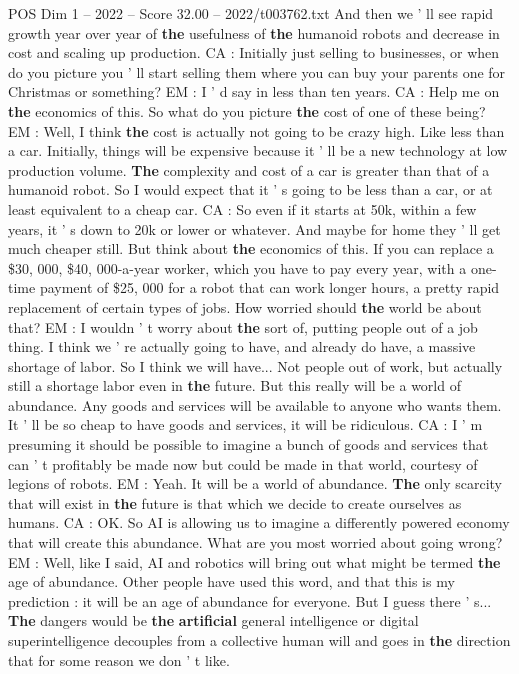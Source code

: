 \begin{textsample}{POS Dim 1 – 2022 – Score 32.00 – 2022/t003762.txt}
And then we ' ll see rapid growth year over year of \textbf{the} usefulness of \textbf{the} humanoid robots and decrease in cost and scaling up production.
CA : Initially just selling to businesses, or when do you picture you ' ll start selling them where you can buy your parents one for Christmas or something?
EM : I ' d say in less than ten years.
CA : Help me on \textbf{the} economics of this.
So what do you picture \textbf{the} cost of one of these being?
EM : Well, I think \textbf{the} cost is actually not going to be crazy high.
Like less than a car.
Initially, things will be expensive because it ' ll be a new technology at low production volume. \textbf{The} complexity and cost of a car is greater than that of a humanoid robot.
So I would expect that it ' s going to be less than a car, or at least equivalent to a cheap car.
CA : So even if it starts at 50k, within a few years, it ' s down to 20k or lower or whatever.
And maybe for home they ' ll get much cheaper still.
But think about \textbf{the} economics of this.
If you can replace a \$30, 000, \$40, 000-a-year worker, which you have to pay every year, with a one-time payment of \$25, 000 for a robot that can work longer hours, a pretty rapid replacement of certain types of jobs.
How worried should \textbf{the} world be about that?
EM : I wouldn ' t worry about \textbf{the} sort of, putting people out of a job thing.
I think we ' re actually going to have, and already do have, a massive shortage of labor.
So I think we will have...
Not people out of work, but actually still a shortage labor even in \textbf{the} future.
But this really will be a world of abundance.
Any goods and services will be available to anyone who wants them.
It ' ll be so cheap to have goods and services, it will be ridiculous.
CA : I ' m presuming it should be possible to imagine a bunch of goods and services that can ' t profitably be made now but could be made in that world, courtesy of legions of robots.
EM : Yeah.
It will be a world of abundance. \textbf{The} only scarcity that will exist in \textbf{the} future is that which we decide to create ourselves as humans.
CA : OK.
So AI is allowing us to imagine a differently powered economy that will create this abundance.
What are you most worried about going wrong?
EM : Well, like I said, AI and robotics will bring out what might be termed \textbf{the} age of abundance.
Other people have used this word, and that this is my prediction : it will be an age of abundance for everyone.
But I guess there ' s... \textbf{The} dangers would be \textbf{the} \textbf{artificial} general intelligence or digital superintelligence decouples from a collective human will and goes in \textbf{the} direction that for some reason we don ' t like.

\end{textsample}
